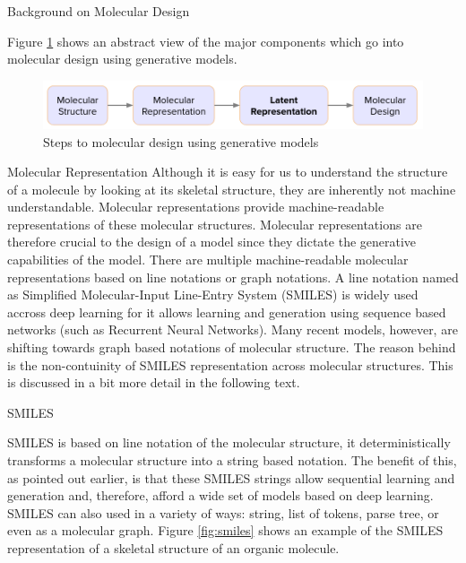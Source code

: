 \documentclass{article}
\begin{document}
\begin{psection}{Background on Molecular Design}

	Figure \ref{fig:mol-design} shows an abstract view of the major components which go into molecular design using generative models. 

	\begin{figure}[htpb]
		\centering
		\includegraphics[width=\textwidth]{includes/mol-design.png}
		\caption{Steps to molecular design using generative models}
		\label{fig:mol-design}
	\end{figure}

	\begin{psubsection}{Molecular Representation}
		Although it is easy for us to understand the structure of a molecule by looking at its skeletal structure, they are inherently not machine understandable. Molecular representations provide machine-readable representations of these molecular structures. Molecular representations are therefore crucial to the design of a model since they dictate the generative capabilities of the model. There are multiple machine-readable molecular representations based on line notations or graph notations. A line notation named as Simplified Molecular-Input Line-Entry System (SMILES)  \citep{smiles} is widely used accross deep learning for it allows learning and generation using sequence based networks (such as Recurrent Neural Networks). Many recent models, however, are shifting towards graph based notations of molecular structure. The reason behind is the non-contuinity of SMILES representation across molecular structures. This is discussed in a bit more detail in the following text.

		\begin{pssubsection}{SMILES}

			SMILES \citep{smiles} is based on line notation of the molecular structure, \ie it deterministically transforms a molecular structure into a string based notation. The benefit of this, as pointed out earlier, is that these SMILES strings allow sequential learning and generation and, therefore, afford a wide set of models based on deep learning. SMILES can also used in a variety of ways: string, list of tokens, parse tree, or even as a molecular graph. Figure \ref{fig:smiles} shows an example of the SMILES representation of a skeletal structure of an organic molecule.


\end{pssubsection}
\end{psubsection}
\end{psection}
\end{document}

